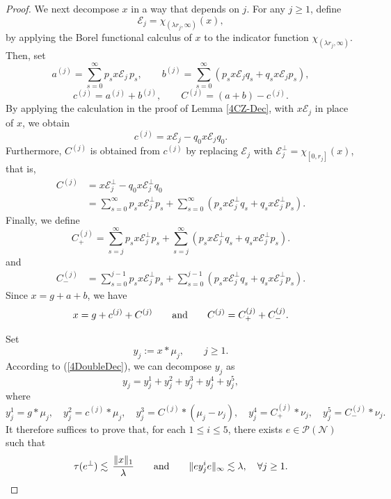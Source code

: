 \documentclass[12pt]{amsart}
\newcommand{\N}{\mbox{${\mathcal N}$}}
\renewcommand{\P}{\mbox{${\mathcal P}$}}
\newcommand{\norm}[1]{\Vert#1\Vert}
\theoremstyle{remark}
\theoremstyle{definition}
\numberwithin{equation}{section}
\begin{document}
\begin{proof}
We next decompose $x$ in a way that depends on $j$. For any $j \ge 1$, define
\[
\mathcal{E}_j = \chi_{(\lambda r_j,\infty)}(x),
\]
by applying the Borel functional calculus of
$x$ to the indicator function 
$\chi_{(\lambda r_j,\infty)}$. Then, set
\[
a^{(j)}
=
\sum_{s=0}^{\infty} p_s x\mathcal{E}_j\,p_s, \qquad
b^{(j)}
=
\sum_{s=0}^{\infty}
\left(
p_s x\mathcal{E}_j q_s
+
q_s x\mathcal{E}_j p_s
\right),
\]
\[
c^{(j)} = a^{(j)} + b^{(j)},
\qquad
C^{(j)} = (a+b) - c^{(j)}.
\]
By applying the calculation in 
the proof of Lemma \ref{4CZ-Dec}, with
$x \mathcal{E}_j$ in place of $x$,
we obtain
\begin{equation}\label{4cj}
c^{(j)}  = x \mathcal{E}_j - q_0 x\mathcal{E}_j q_0.
\end{equation}
Furthermore, $C^{(j)}$ is obtained from $c^{(j)}$ by replacing $\mathcal{E}_j$ with 
\(\mathcal{E}_j^\perp = \chi_{[0,r_j]}(x)\), that is,
\begin{align}\label{4Cj}
C^{(j)} &= x\mathcal{E}_j^\perp - q_0 x \mathcal{E}_j^\perp q_0\\
& = \sum_{s=0}^{\infty} p_sx\mathcal{E}_j^{\perp}p_s
+
\sum_{s=0}^{\infty}
\left(
p_sx\mathcal{E}_j^{\perp}q_s
+
q_sx\mathcal{E}_j^{\perp}p_s
\right).\nonumber
\end{align}
Finally, we define
\begin{equation}\label{4Cj+}
C^{(j)}_{+}
=
\sum_{s=j}^{\infty} p_s x\mathcal{E}_j^{\perp}p_s
+
\sum_{s=j}^{\infty}
\left(
p_s x\mathcal{E}_j^{\perp}q_s
+
q_sx\mathcal{E}_j^{\perp}p_s
\right).
\end{equation}
and 
\begin{align*}
C^{(j)}_{-}
&
=
\sum_{s=0}^{j-1} p_sx\mathcal{E}_j^{\perp}p_s
+
\sum_{s=0}^{j-1}
\left(
p_sx\mathcal{E}_j^{\perp}q_s
+
q_sx\mathcal{E}_j^{\perp}p_s
\right).
\end{align*}
Since $x=g+a+b$, we have
\begin{equation}\label{4DoubleDec}
x
= g + c^{(j)} + C^{(j)}
\qquad\hbox{and}\qquad
C^{(j)}= C^{(j)}_{+} + C^{(j)}_{-}.
\end{equation}





Set
\[
y_j := x * \mu_j, \qquad j \ge 1.
\]
According to (\ref{4DoubleDec}), we can decompose $y_j$ as
\[
y_j
=
y_j^1+y_j^2+y_j^3+y_j^4+y_j^5,
\]
where
\[
y_j^1 = g * \mu_j,\quad
y_j^2 = c^{(j)} * \mu_j,\quad
y_j^3 = C^{(j)} * (\mu_j-\nu_j),\quad
y_j^4 = C^{(j)}_{+} * \nu_j,\quad
y_j^5 =C^{(j)}_{-} * \nu_j.
\]
It therefore suffices to prove that, for each 
$1 \le i \le 5$, there exists $e\in\P(\N)$ such that
\begin{equation}\label{ineq:maximal-condition}
\tau(e^\perp)\lesssim \,\frac{\norm{x}_1}{\lambda}
\qquad\hbox{and}\qquad
\norm{ey_{j}^{i}e}_\infty\lesssim \lambda,\quad \forall j\geq 1.
\end{equation}





\end{proof}
\end{document}
